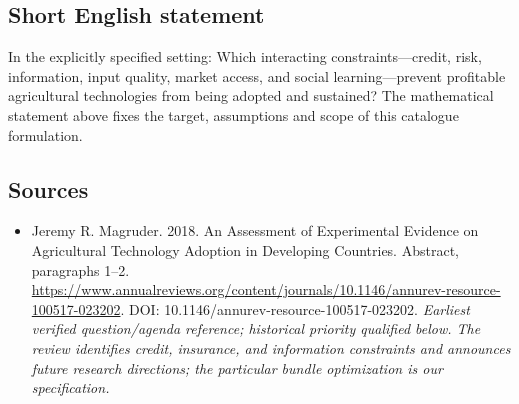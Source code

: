 \documentclass[11pt]{article}
\begin{document}
\subsection{Short English statement}
In the explicitly specified setting: Which interacting constraints—credit, risk, information, input quality, market access, and social learning—prevent profitable agricultural technologies from being adopted and sustained? The mathematical statement above fixes the target, assumptions and scope of this catalogue formulation.

\subsection{Sources}
\begin{itemize}\raggedright
\item[\textnormal{[S1]}]\hypertarget{source:30007659:1}{} Jeremy R. Magruder. 2018. An Assessment of Experimental Evidence on Agricultural Technology Adoption in Developing Countries. Abstract, paragraphs 1–2.
\url{https://www.annualreviews.org/content/journals/10.1146/annurev-resource-100517-023202}.
DOI: 10.1146/annurev-resource-100517-023202.
{\small\textit{Earliest verified question/agenda reference; historical priority qualified below. The review identifies credit, insurance, and information constraints and announces future research directions; the particular bundle optimization is our specification.}}
\end{itemize}
\end{document}
